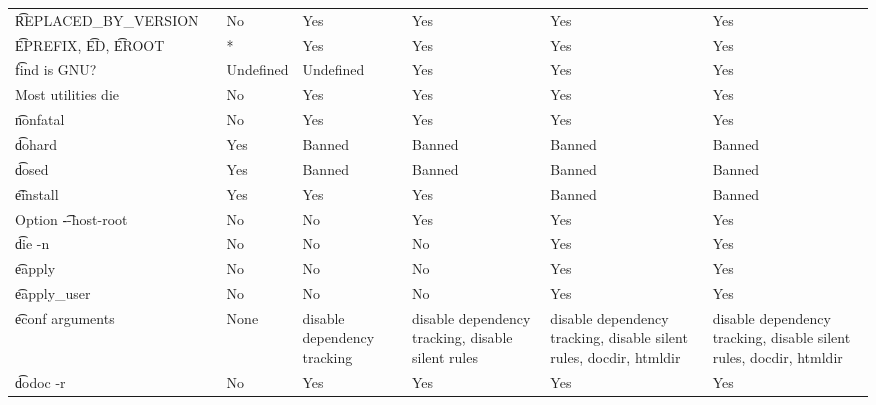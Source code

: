 \begin{landscape}
\begin{longtable}{llP{7.5em}P{7.5em}P{7.5em}P{7.5em}P{7.5em}}
\t{REPLACED_BY_VERSION} &  &
    No & Yes & Yes & Yes & Yes \\

\t{EPREFIX}, \t{ED}, \t{EROOT} &  &
    * & Yes & Yes & Yes & Yes \\

\t{find} is GNU? &  &
    Undefined & Undefined & Yes & Yes & Yes \\

Most utilities die &  &
    No & Yes & Yes & Yes & Yes \\

\t{nonfatal} &  &
    No & Yes & Yes & Yes & Yes \\

\t{dohard} &  &
    Yes & Banned & Banned & Banned & Banned \\

\t{dosed} &  &
    Yes & Banned & Banned & Banned & Banned \\

\t{einstall} &  &
    Yes & Yes & Yes & Banned & Banned \\

Option \t{-{}-host-root} &  &
    No & No & Yes & Yes & Yes \\

\t{die -n} &  &
    No & No & No & Yes & Yes \\

\t{eapply} &  &
    No & No & No & Yes & Yes \\

\t{eapply_user} &  &
    No & No & No & Yes & Yes \\

\t{econf} arguments &  &
    None & disable dependency tracking &
    disable dependency tracking, disable silent rules &
    disable dependency tracking, disable silent rules, docdir, htmldir &
    disable dependency tracking, disable silent rules, docdir, htmldir \\

\t{dodoc -r} &  &
    No & Yes & Yes & Yes & Yes \\


\end{longtable}
\end{landscape}
